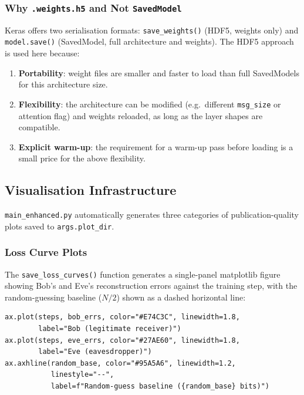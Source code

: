 \documentclass[12pt, a4paper]{article}
\newcommand{\code}[1]{\texttt{\color{CodeRed}#1}}
\begin{document}
\subsubsection*{Why \texttt{.weights.h5} and Not \texttt{SavedModel}}

Keras offers two serialisation formats: \code{save\_weights()} (HDF5,
weights only) and \code{model.save()} (SavedModel, full architecture
and weights). The HDF5 approach is used here because:

\begin{enumerate}[leftmargin=2em, itemsep=3pt]
  \item \textbf{Portability}: weight files are smaller and faster to
        load than full SavedModels for this architecture size.
  \item \textbf{Flexibility}: the architecture can be modified
        (e.g.\ different \code{msg\_size} or attention flag) and weights
        reloaded, as long as the layer shapes are compatible.
  \item \textbf{Explicit warm-up}: the requirement for a warm-up
        pass before loading is a small price for the above flexibility.
\end{enumerate}

\subsection{Visualisation Infrastructure}
\label{subsec:visualisation}

\code{main\_enhanced.py} automatically generates three categories of
publication-quality plots saved to \code{args.plot\_dir}.

\subsubsection*{Loss Curve Plots}

The \code{save\_loss\_curves()} function generates a single-panel
matplotlib figure showing Bob's and Eve's reconstruction errors
against the training step, with the random-guessing baseline
($N/2$) shown as a dashed horizontal line:

\begin{lstlisting}[caption={Loss curve generation in \code{save\_loss\_curves()}}]
ax.plot(steps, bob_errs, color="#E74C3C", linewidth=1.8,
        label="Bob (legitimate receiver)")
ax.plot(steps, eve_errs, color="#27AE60", linewidth=1.8,
        label="Eve (eavesdropper)")
ax.axhline(random_base, color="#95A5A6", linewidth=1.2,
           linestyle="--",
           label=f"Random-guess baseline ({random_base} bits)")
\end{lstlisting}
\end{document}
